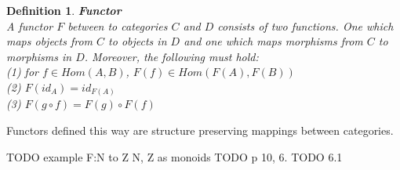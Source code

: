 \documentclass[17pt]{extarticle}
\newtheorem{definition}{Definition}
\begin{document}
\begin{definition}
	\textbf{Functor}\\
	A functor $F$ between to categories $C$ and $D$ consists of two functions.
	One which maps objects from $C$ to objects in $D$ and one which maps morphisms from
	$C$ to morphisms in $D$. Moreover, the following must hold:\\
	(1) for $f\in Hom(A,B)$, $F(f)\in Hom(F(A), F(B))$\\
	(2) $F(id_A)=id_{F(A)}$\\
	(3) $F(g\circ f)=F(g)\circ F(f)$
\end{definition}
Functors defined this way are structure preserving mappings between categories.

TODO example F:N to Z   N, Z as monoids
TODO p 10, 6.
TODO 6.1
\end{document}
